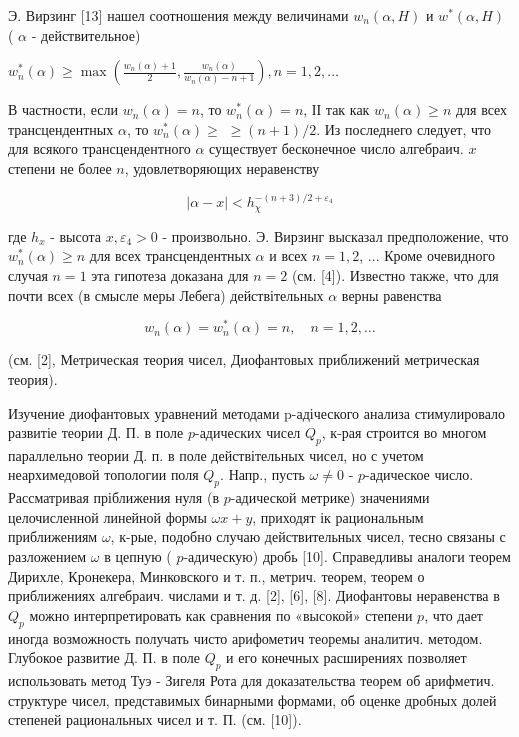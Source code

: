 \documentclass[10pt]{article}
\begin{document}
Э. Вирзинг [13] нашел соотношения между величинами $w_{n}(\alpha, H)$ и $w^{*}(\alpha, H)$ ( $\alpha$ - действительное)



$w_{n}^{*}(\alpha) \geqslant \max \left(\frac{w_{n}(\alpha)+1}{2}, \frac{w_{n}(\alpha)}{w_{n}(\alpha)-n+1}\right), n=1,2, \ldots$



В частности, если $w_{n}(\alpha)=n$, то $w_{n}^{*}(\alpha)=n$, ІІ так как $w_{n}(\alpha) \geqslant n$ для всех трансцендентных $\alpha$, то $w_{n}^{*}(\alpha) \geqslant$ $\geqslant(n+1) / 2$. Из последнего следует, что для всякого трансцендентного $\alpha$ существует бесконечное число алгебраич. $x$ степени не более $n$, удовлетворяющих неравенству



\[

|\alpha-x|<h_{\chi}^{-(n+3) / 2+\varepsilon_{4}}

\]



где $h_{x}$ - высота $x, \varepsilon_{4}>0$ - произвольно. Э. Вирзинг высказал предположение, что $w_{n}^{*}(\alpha) \geqslant n$ для всех трансцендентных $\alpha$ и всех $n=1,2$, ... Кроме очевидного случая $n=1$ эта гипотеза доказана для $n=2$ (см. [4]). Известно также, что для почти всех (в смысле меры Лебега) действітельных $\alpha$ верны равенства



\[

w_{n}(\alpha)=w_{n}^{*}(\alpha)=n, \quad n=1,2, \ldots

\]



(см. [2], Метрическая теория чисел, Диофантовых приближений метрическая теория).



Изучение диофантовых уравнений методами p-адіческого анализа стимулировало развитіе теории Д. П. в поле $p$-адических чисел $Q_{p}$, к-рая строится во многом параллельно теории Д. п. в поле действітельных чисел, но с учетом неархимедовой топологии поля $Q_{p}$. Напр., пусть $\omega \neq 0$ - $p$-адическое число. Рассматривая пріближения нуля (в $p$-адической метрике) значениями целочисленной линейной формы $\omega x+y$, приходят ік рациональным приближениям $\omega$, к-рые, подобно случаю действительных чисел, тесно связаны с разложением $\omega$ в цепную ( $p$-адическую) дробь [10]. Справедливы аналоги теорем Дирихле, Кронекера, Минковского и т. п., метрич. теорем, теорем о приближениях алгебраич. числами и т. д. [2], [6], [8]. Диофантовы неравенства в $Q_{p}$ можно интерпретировать как сравнения по «высокой» степени $p$, что дает иногда возможность получать чисто арифометич теоремы аналитич. методом. Глубокое развитие Д. П. в поле $Q_{p}$ и его конечных расширениях позволяет использовать метод Туэ - Зигеля Рота для доказательства теорем об арифметич. структуре чисел, представимых бинарными формами, об оценке дробных долей степеней рациональных чисел и т. П. (см. [10]).
\end{document}
